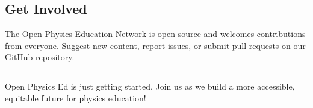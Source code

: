 \subsection{Get Involved}\label{get-involved}

The Open Physics Education Network is open source and welcomes
contributions from everyone. Suggest new content, report issues, or
submit pull requests on our
\href{https://github.com/open-physics-ed/open-physics-ed-org.github.io}{GitHub
repository}.

\begin{center}\rule{0.5\linewidth}{0.5pt}\end{center}

Open Physics Ed is just getting started. Join us as we build a more
accessible, equitable future for physics education!
